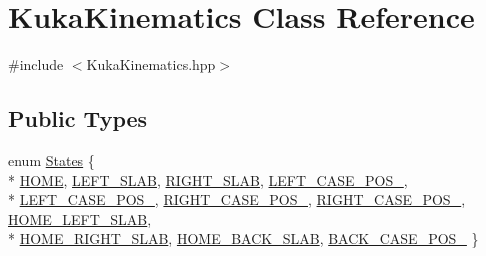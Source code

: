 \hypertarget{classKukaKinematics}{}\section{Kuka\+Kinematics Class Reference}
\label{classKukaKinematics}


{\ttfamily \#include $<$Kuka\+Kinematics.\+hpp$>$}

\subsection*{Public Types}
\begin{DoxyCompactItemize}
\item 
enum \hyperlink{classKukaKinematics_a89f02e319ae430af22785077d058fab7}{States} \{ \\*
\hyperlink{classKukaKinematics_a89f02e319ae430af22785077d058fab7a27d93ef30d3f503edbe258b5170fd6db}{H\+O\+ME}, 
\hyperlink{classKukaKinematics_a89f02e319ae430af22785077d058fab7a27371395d775497e367f1fabbf210524}{L\+E\+F\+T\+\_\+\+S\+L\+AB}, 
\hyperlink{classKukaKinematics_a89f02e319ae430af22785077d058fab7a1ec031b66c3cd9476ea595fa592c5eed}{R\+I\+G\+H\+T\+\_\+\+S\+L\+AB}, 
\hyperlink{classKukaKinematics_a89f02e319ae430af22785077d058fab7ab4ab018b3ef029963ad9aadd415a1055}{L\+E\+F\+T\+\_\+\+C\+A\+S\+E\+\_\+\+P\+O\+S\+\_}, 
\\*
\hyperlink{classKukaKinematics_a89f02e319ae430af22785077d058fab7a1eed7242705ac2cc30ec46ca56dc7816}{L\+E\+F\+T\+\_\+\+C\+A\+S\+E\+\_\+\+P\+O\+S\+\_}, 
\hyperlink{classKukaKinematics_a89f02e319ae430af22785077d058fab7a1f80ebc83912f18e39895c915e3c747c}{R\+I\+G\+H\+T\+\_\+\+C\+A\+S\+E\+\_\+\+P\+O\+S\+\_}, 
\hyperlink{classKukaKinematics_a89f02e319ae430af22785077d058fab7a85d0623821582219b465df16904e015e}{R\+I\+G\+H\+T\+\_\+\+C\+A\+S\+E\+\_\+\+P\+O\+S\+\_}, 
\hyperlink{classKukaKinematics_a89f02e319ae430af22785077d058fab7aee095a8021fbb352a5fb72925a8efbe0}{H\+O\+M\+E\+\_\+\+L\+E\+F\+T\+\_\+\+S\+L\+AB}, 
\\*
\hyperlink{classKukaKinematics_a89f02e319ae430af22785077d058fab7ac047823570a6c6c92a9a28f6f4ea8775}{H\+O\+M\+E\+\_\+\+R\+I\+G\+H\+T\+\_\+\+S\+L\+AB}, 
\hyperlink{classKukaKinematics_a89f02e319ae430af22785077d058fab7a2d904be9e26df1fc313ca2c45a096b38}{H\+O\+M\+E\+\_\+\+B\+A\+C\+K\+\_\+\+S\+L\+AB}, 
\hyperlink{classKukaKinematics_a89f02e319ae430af22785077d058fab7a53a43f6110c55537d30347ba401402cf}{B\+A\+C\+K\+\_\+\+C\+A\+S\+E\+\_\+\+P\+O\+S\+\_}
 \}
\end{DoxyCompactItemize}
